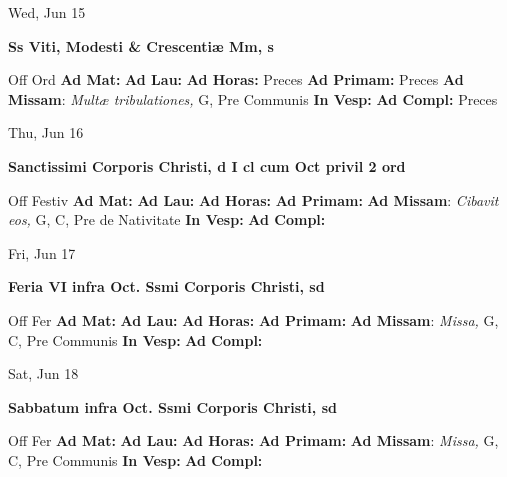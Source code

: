 \documentclass[10pt]{article}
\begin{document}
\begin{minipage}{3.5in}
\vspace{2em}\begin{center}
Wed, Jun 15
\end{center}\textbf{ \large Ss Viti, Modesti \& Crescentiæ Mm, \textnormal{\normalsize s}}
\begin{justify}
Off Ord
\textbf{Ad Mat: }
\textbf{Ad Lau: }
\textbf{Ad Horas: }Preces
\textbf{Ad Primam: }Preces
\textbf{Ad Missam}: \textit{Multæ tribulationes,} G, Pre Communis
\textbf{In Vesp: }
\textbf{Ad Compl: }Preces\end{justify}
\end{minipage}



\begin{minipage}{3.5in}
\vspace{2em}\begin{center}
Thu, Jun 16
\end{center}\textbf{ \large Sanctissimi Corporis Christi, \textnormal{\normalsize d I cl cum Oct privil 2 ord}}
\begin{justify}
Off Festiv
\textbf{Ad Mat: }
\textbf{Ad Lau: }
\textbf{Ad Horas: }
\textbf{Ad Primam: }
\textbf{Ad Missam}: \textit{Cibavit eos,} G, C, Pre de Nativitate
\textbf{In Vesp: }
\textbf{Ad Compl: }\end{justify}
\end{minipage}



\begin{minipage}{3.5in}
\vspace{2em}\begin{center}
Fri, Jun 17
\end{center}\textbf{ \large Feria VI infra Oct. Ssmi Corporis Christi, \textnormal{\normalsize sd}}
\begin{justify}
Off Fer
\textbf{Ad Mat: }
\textbf{Ad Lau: }
\textbf{Ad Horas: }
\textbf{Ad Primam: }
\textbf{Ad Missam}: \textit{Missa,} G, C, Pre Communis
\textbf{In Vesp: }
\textbf{Ad Compl: }\end{justify}
\end{minipage}



\begin{minipage}{3.5in}
\vspace{2em}\begin{center}
Sat, Jun 18
\end{center}\textbf{ \large Sabbatum infra Oct. Ssmi Corporis Christi, \textnormal{\normalsize sd}}
\begin{justify}
Off Fer
\textbf{Ad Mat: }
\textbf{Ad Lau: }
\textbf{Ad Horas: }
\textbf{Ad Primam: }
\textbf{Ad Missam}: \textit{Missa,} G, C, Pre Communis
\textbf{In Vesp: }
\textbf{Ad Compl: }\end{justify}
\end{minipage}
\end{document}
